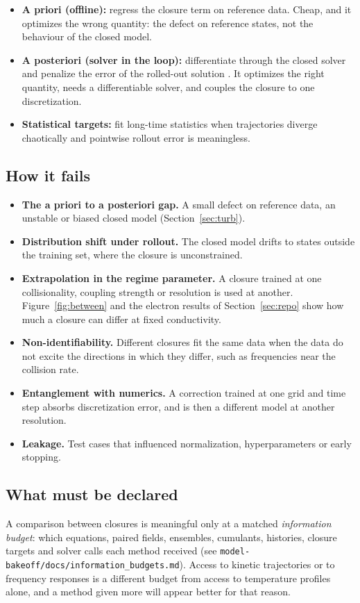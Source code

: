 \begin{itemize}
  \item \textbf{A priori (offline):} regress the closure term on reference
    data. Cheap, and it optimizes the wrong quantity: the defect on
    reference states, not the behaviour of the closed model.
  \item \textbf{A posteriori (solver in the loop):} differentiate through
    the closed solver and penalize the error of the rolled-out solution
    \cite{ListChenThuerey22,Kochkov21}. It optimizes the right quantity,
    needs a differentiable solver, and couples the closure to one
    discretization.
  \item \textbf{Statistical targets:} fit long-time statistics when
    trajectories diverge chaotically and pointwise rollout error is
    meaningless.
\end{itemize}

\subsection{How it fails}

\begin{itemize}
  \item \textbf{The a priori to a posteriori gap.} A small defect on
    reference data, an unstable or biased closed model
    (Section~\ref{sec:turb}).
  \item \textbf{Distribution shift under rollout.} The closed model drifts
    to states outside the training set, where the closure is unconstrained.
  \item \textbf{Extrapolation in the regime parameter.} A closure trained
    at one collisionality, coupling strength or resolution is used at
    another. Figure~\ref{fig:between} and the electron results of
    Section~\ref{sec:repo} show how much a closure can differ at fixed
    conductivity.
  \item \textbf{Non-identifiability.} Different closures fit the same data
    when the data do not excite the directions in which they differ, such
    as frequencies near the collision rate.
  \item \textbf{Entanglement with numerics.} A correction trained at one
    grid and time step absorbs discretization error, and is then a
    different model at another resolution.
  \item \textbf{Leakage.} Test cases that influenced normalization,
    hyperparameters or early stopping.
\end{itemize}

\subsection{What must be declared}

A comparison between closures is meaningful only at a matched
\emph{information budget}: which equations, paired fields, ensembles,
cumulants, histories, closure targets and solver calls each method
received (see \texttt{model-bakeoff/docs/information\_budgets.md}). Access
to kinetic trajectories or to frequency responses is a different budget
from access to temperature profiles alone, and a method given more will
appear better for that reason.
